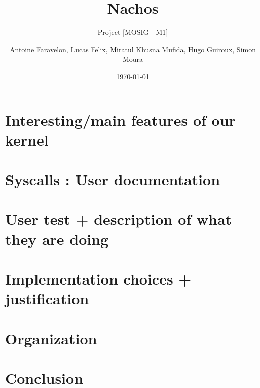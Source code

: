 \documentclass[a4paper,10pt]{article}
\title{Nachos}
\subtitle{Project [MOSIG - M1]}
\author{Antoine Faravelon, Lucas Felix, Miratul Khusna Mufida, Hugo Guiroux, Simon Moura}
\date{\today}
\begin{document}
\maketitle

\newpage
\tableofcontents
\newpage

\begin{abstract}
\end{abstract}

\section{Interesting/main features of our kernel}

\section{Syscalls : User documentation}

\section{User test + description of what they are doing}

\section{Implementation choices + justification}

\section{Organization}
    

\section{Conclusion}

\end{document}
